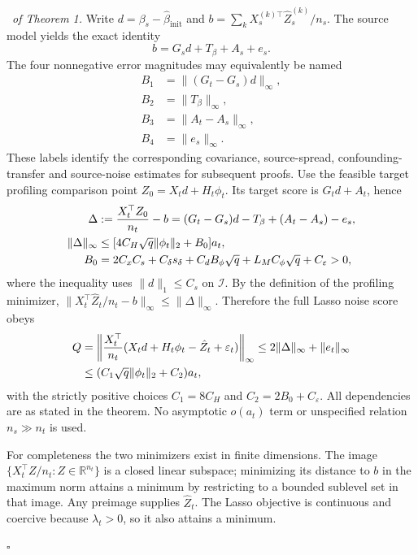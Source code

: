 \documentclass[12pt]{article}
\newenvironment{pf}{{\noindent \it Proof}\ }{\hfill $\square$\par}
\begin{document}
\begin{pf}{\it of Theorem 1.}
Write $d=\beta_s-\hat\beta_{\mathrm{init}}$ and
$b=\sum_kX_s^{(k)\top}\hat Z_s^{(k)}/n_s$.
The source model yields the exact identity
\[
 b=G_sd+T_\beta+A_s+e_s.
\]
The four nonnegative error magnitudes may equivalently be named
\begin{align}
 B_1&=\|(G_t-G_s)d\|_\infty,\label{term:B_1}\tag{$B_1$}\\
 B_2&=\|T_\beta\|_\infty,\label{term:B_2}\tag{$B_2$}\\
 B_3&=\|A_t-A_s\|_\infty,\label{term:B_3}\tag{$B_3$}\\
 B_4&=\|e_s\|_\infty.\label{term:B_4}\tag{$B_4$}
\end{align}
These labels identify the corresponding covariance, source-spread,
confounding-transfer and source-noise estimates for subsequent proofs.
Use the feasible target profiling comparison point
$Z_0=X_td+H_t\phi_t$. Its target score is $G_td+A_t$, hence
\begin{align}
 \Delta &:={X_t^\top Z_0\over n_t}-b
       =(G_t-G_s)d-T_\beta+(A_t-A_s)-e_s,
 \label{eq:profiled_score_decomposition}\\
 \|\Delta\|_\infty&\le
 [4C_H\sqrt q\|\phi_t\|_2+B_0]a_t,\notag\\
 B_0&=2C_xC_s+C_\delta s_\delta+C_dB_\phi\sqrt q
       +L_MC_\phi\sqrt q+C_\varepsilon>0,\notag
\end{align}
where the inequality uses $\|d\|_1\le C_s$ on $\mathcal I$.
By the definition of the profiling minimizer,
$\|X_t^\top\hat Z_t/n_t-b\|_\infty\le\|\Delta\|_\infty$.
Therefore the full Lasso noise score obeys
\begin{align}
 Q&=\left\|{X_t^\top\over n_t}
       (X_td+H_t\phi_t-\hat Z_t+\varepsilon_t)\right\|_\infty
       \le2\|\Delta\|_\infty+\|e_t\|_\infty\notag\\
  &\le(C_1\sqrt q\|\phi_t\|_2+C_2)a_t,
 \label{eq:corrected_profiled_score_bound}
\end{align}
with the strictly positive choices $C_1=8C_H$ and
$C_2=2B_0+C_\varepsilon$. All dependencies are as stated in the theorem.
No asymptotic $o(a_t)$ term or unspecified relation $n_s\gg n_t$ is used.

For completeness the two minimizers exist in finite dimensions. The image
$\{X_t^\top Z/n_t:Z\in\mathbb R^{n_t}\}$ is a closed linear subspace;
minimizing its distance to $b$ in the maximum norm attains a minimum
by restricting to a bounded sublevel set in that image. Any preimage
supplies $\hat Z_t$. The Lasso objective is continuous and coercive because
$\lambda_t>0$, so it also attains a minimum.


\end{pf}
\end{document}
